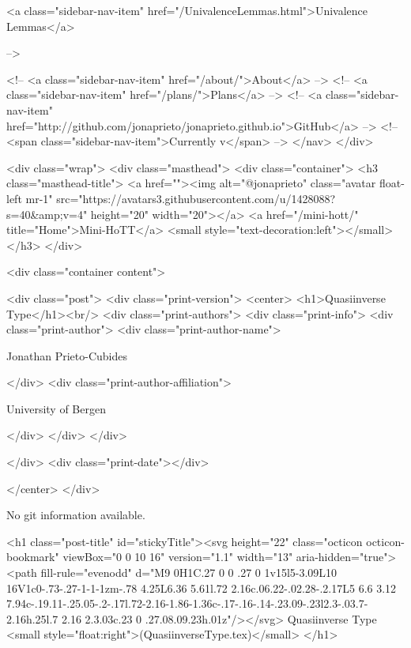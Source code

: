       
    
      
        
          <a class="sidebar-nav-item" href="/UnivalenceLemmas.html">Univalence Lemmas</a>
        
      
     -->

    <!-- <a class="sidebar-nav-item" href="/about/">About</a> -->
    <!-- <a class="sidebar-nav-item" href="/plans/">Plans</a> -->
    <!-- <a class="sidebar-nav-item" href="http://github.com/jonaprieto/jonaprieto.github.io">GitHub</a> -->
    <!-- <span class="sidebar-nav-item">Currently v</span> -->
  </nav>
</div>

    <div class="wrap">
      <div class="masthead">
        <div class="container">
          <h3 class="masthead-title">
            <a href=""><img alt="@jonaprieto" class="avatar float-left mr-1" src="https://avatars3.githubusercontent.com/u/1428088?s=40&amp;v=4" height="20" width="20"></a>
            <a href="/mini-hott/" title="Home">Mini-HoTT</a>
            <small style="text-decoration:left"></small>
          </h3>
        </div>
      
      <div class="container content">
        







<div class="post">
  <div class="print-version">
    <center>
      <h1>Quasiinverse Type</h1><br/>
        <div class="print-authors">
          <div class="print-info">
            <div class="print-author">
              <div class="print-author-name">
                
                  Jonathan Prieto-Cubides
                
              </div>
              <div class="print-author-affiliation">
                
                  University of Bergen
                
                </div>
            </div>
          </div>
          
          
        </div>
        <div class="print-date"></div>
        
        
    </center>
  </div>

  
  No git information available.
  

  <h1 class="post-title" id="stickyTitle"><svg height="22" class="octicon octicon-bookmark" viewBox="0 0 10 16" version="1.1" width="13" aria-hidden="true"><path fill-rule="evenodd" d="M9 0H1C.27 0 0 .27 0 1v15l5-3.09L10 16V1c0-.73-.27-1-1-1zm-.78 4.25L6.36 5.61l.72 2.16c.06.22-.02.28-.2.17L5 6.6 3.12 7.94c-.19.11-.25.05-.2-.17l.72-2.16-1.86-1.36c-.17-.16-.14-.23.09-.23l2.3-.03.7-2.16h.25l.7 2.16 2.3.03c.23 0 .27.08.09.23h.01z"/></svg> Quasiinverse Type <small style="float:right">(QuasiinverseType.tex)</small>
  </h1>

